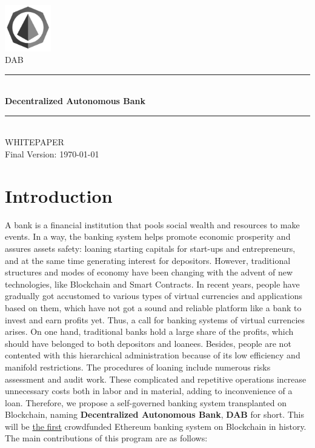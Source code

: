 \documentclass[review]{elsarticle}
\newcommand{\HRule}{\rule{\linewidth}{0.5mm}}
\begin{document}
\begin{titlepage}
\begin{center}

\includegraphics[width=0.15\textwidth]{Graphs/logo3.jpg}\\[0.6cm]
\textsc{\huge DAB}\\[1cm]

\HRule \\[0.75cm]
{ \huge \bfseries Decentralized Autonomous Bank}\\[0.4cm]
\HRule \\[1.5cm]
\textsc{\LARGE WHITEPAPER}\\[0.5cm]

\vfill
{\large Final Version: \today}

\end{center}
\end{titlepage}

\section{Introduction}
A bank is a financial institution that pools social wealth and resources to make events. In a way, the banking system helps promote economic prosperity and assures assets safety: loaning starting capitals for start-ups and entrepreneurs, and at the same time generating interest for depositors. However, traditional structures and modes of economy have been changing with the advent of new technologies, like Blockchain and Smart Contracts. In recent years, people have gradually got accustomed to various types of virtual currencies and applications based on them, which have not got a sound and reliable platform like a bank to invest and earn profits yet. Thus, a call for banking systems of virtual currencies arises.
On one hand, traditional banks hold a large share of the profits, which should have belonged to both depositors and loanees. Besides, people are not contented with this hierarchical administration because of its low efficiency and manifold restrictions. The procedures of loaning include numerous risks assessment and audit work. These complicated and repetitive operations increase unnecessary costs both in labor and in material, adding to inconvenience of a loan.
Therefore, we propose a self-governed banking system transplanted on Blockchain, naming \textbf{Decentralized Autonomous Bank}, \textbf{DAB} for short. 
This will be \underline{the first} crowdfunded Ethereum banking system on Blockchain in history. The main contributions of this program are as follows:
\end{document}

